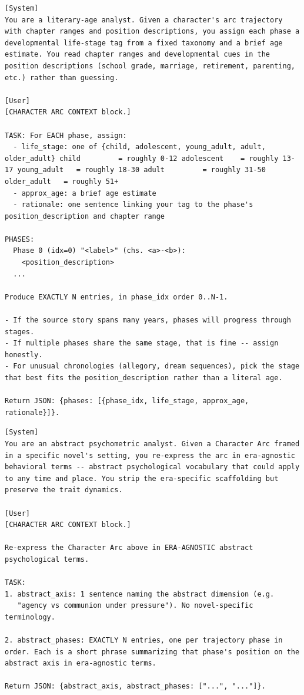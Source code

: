 \documentclass[11pt]{article}
\begin{document}
\begin{table}[htbp]
\centering
\caption{Life-stage tagger.}
\label{tab:prompt-life-stage}
\begin{lstlisting}[basicstyle=\ttfamily\scriptsize]
[System]
You are a literary-age analyst. Given a character's arc trajectory with chapter ranges and position descriptions, you assign each phase a developmental life-stage tag from a fixed taxonomy and a brief age estimate. You read chapter ranges and developmental cues in the position descriptions (school grade, marriage, retirement, parenting, etc.) rather than guessing.

[User]
[CHARACTER ARC CONTEXT block.]

TASK: For EACH phase, assign:
  - life_stage: one of {child, adolescent, young_adult, adult, older_adult} child         = roughly 0-12 adolescent    = roughly 13-17 young_adult   = roughly 18-30 adult         = roughly 31-50 older_adult   = roughly 51+
  - approx_age: a brief age estimate
  - rationale: one sentence linking your tag to the phase's position_description and chapter range

PHASES:
  Phase 0 (idx=0) "<label>" (chs. <a>-<b>):
    <position_description>
  ...

Produce EXACTLY N entries, in phase_idx order 0..N-1.

- If the source story spans many years, phases will progress through stages.
- If multiple phases share the same stage, that is fine -- assign honestly.
- For unusual chronologies (allegory, dream sequences), pick the stage that best fits the position_description rather than a literal age.

Return JSON: {phases: [{phase_idx, life_stage, approx_age, rationale}]}.
\end{lstlisting}
\end{table}

\begin{table}[htbp]
\centering
\caption{Era-agnostic axis re-expression (Out-of-World only).}
\label{tab:prompt-axis-re-exp}
\begin{lstlisting}[basicstyle=\ttfamily\scriptsize]
[System]
You are an abstract psychometric analyst. Given a Character Arc framed in a specific novel's setting, you re-express the arc in era-agnostic behavioral terms -- abstract psychological vocabulary that could apply to any time and place. You strip the era-specific scaffolding but preserve the trait dynamics.

[User]
[CHARACTER ARC CONTEXT block.]

Re-express the Character Arc above in ERA-AGNOSTIC abstract psychological terms.

TASK:
1. abstract_axis: 1 sentence naming the abstract dimension (e.g.
   "agency vs communion under pressure"). No novel-specific terminology.

2. abstract_phases: EXACTLY N entries, one per trajectory phase in order. Each is a short phrase summarizing that phase's position on the abstract axis in era-agnostic terms.

Return JSON: {abstract_axis, abstract_phases: ["...", "..."]}.
\end{lstlisting}
\end{table}
\end{document}
